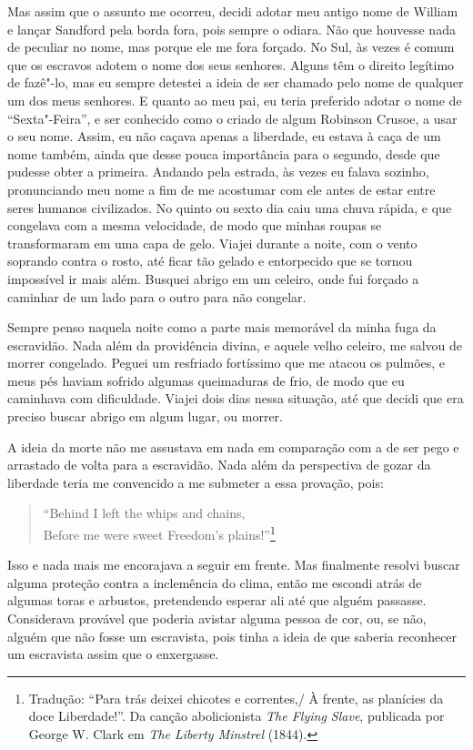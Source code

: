 Mas assim que o assunto me ocorreu, decidi adotar meu antigo nome de
William e lançar Sandford pela borda fora, pois sempre o odiara. Não que
houvesse nada de peculiar no nome, mas porque ele me fora forçado. No
Sul, às vezes é comum que os escravos adotem o nome dos seus senhores.
Alguns têm o direito legítimo de fazê"-lo, mas eu sempre detestei a ideia
de ser chamado pelo nome de qualquer um dos meus senhores. E quanto ao
meu pai, eu teria preferido adotar o nome de ``Sexta"-Feira'', e ser
conhecido como o criado de algum Robinson Crusoe, a usar o seu nome. %
Assim, eu não caçava apenas a liberdade, eu estava à caça de um nome
também, ainda que desse pouca importância para o segundo, desde que
pudesse obter a primeira. Andando pela estrada, às vezes eu falava
sozinho, pronunciando meu nome a fim de me acostumar com ele antes de
estar entre seres humanos civilizados. No quinto ou sexto dia caiu uma
chuva rápida, e que congelava com a mesma velocidade, de modo que minhas
roupas se transformaram em uma capa de gelo. Viajei durante a noite, com
o vento soprando contra o rosto, até ficar tão gelado e entorpecido que
se tornou impossível ir mais além. Busquei abrigo em um celeiro, onde
fui forçado a caminhar de um lado para o outro para não congelar.

Sempre penso naquela noite como a parte mais memorável da minha fuga da
escravidão. Nada além da providência divina, e aquele velho celeiro, me
salvou de morrer congelado. Peguei um resfriado fortíssimo que me atacou
os pulmões, e meus pés haviam sofrido algumas queimaduras de frio, de
modo que eu caminhava com dificuldade. Viajei dois dias nessa situação,
até que decidi que era preciso buscar abrigo em algum lugar, ou morrer.

A ideia da morte não me assustava em nada em comparação com a de ser
pego e arrastado de volta para a escravidão. Nada além da perspectiva de
gozar da liberdade teria me convencido a me submeter a essa provação,
pois:

\pagebreak

\begin{verse}
``Behind I left the whips and chains,\\
Before me were sweet Freedom's plains!''\footnote{Tradução: ``Para trás deixei chicotes e correntes,/ À frente, as planícies da doce Liberdade!''. Da canção abolicionista \emph{The Flying
  Slave}, publicada por George W. Clark em \emph{The Liberty Minstrel} (1844).}
\end{verse}

Isso e nada mais me encorajava a seguir em frente. Mas finalmente
resolvi buscar alguma proteção contra a inclemência do clima, então me
escondi atrás de algumas toras e arbustos, pretendendo esperar ali até
que alguém passasse. Considerava provável que poderia avistar alguma
pessoa de cor, ou, se não, alguém que não fosse um escravista, pois
tinha a ideia de que saberia reconhecer um escravista assim que o
enxergasse.

